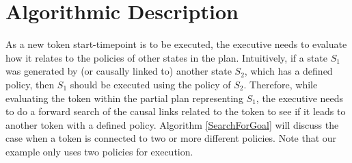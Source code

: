 %
%
%
%
%


\section{Algorithmic Description}
\label{sec:algo}

As a new token start-timepoint is to be executed, the executive needs
to evaluate how it relates to the policies of other states in the
plan. Intuitively, if a state $S_1$ was generated by (or causally
linked to) another state $S_2$, which has a defined policy, then $S_1$
should be executed using the policy of $S_2$. Therefore, while
evaluating the token within the partial plan representing $S_1$, the
executive needs to do a forward search of the causal links related to
the token to see if it leads to another token with a defined
policy. Algorithm \ref{SearchForGoal} will discuss the case when a
token is connected to two or more different policies. Note that our
example only uses two policies for execution.  %



